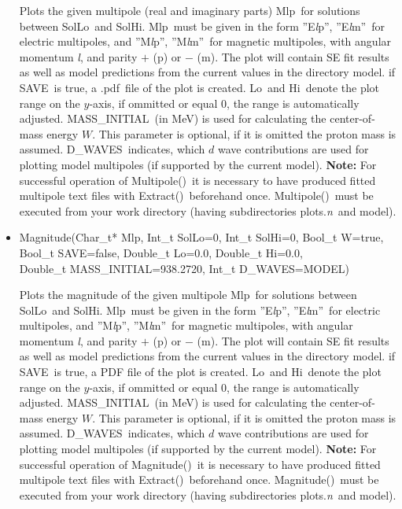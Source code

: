 \documentclass[a4paper,10pt]{article}
\def\tt{\ttfamily}
\def\rm{\rmfamily}
\begin{document}
\begin{itemize}
Plots the given multipole (real and imaginary parts) \tt Mlp\rm\ for solutions between \tt SolLo\rm\ and \tt SolHi\rm.
\tt Mlp\rm\ must be given in the form \tt ''E\textit{l}p''\rm,
\tt ''E\textit{l}m''\rm\ 
for electric multipoles, and
\tt ''M\textit{l}p''\rm,
\tt ''M\textit{l}m''\rm\ 
for magnetic multipoles, with angular momentum \tt\textit{l}\rm, and parity
$+$ (\tt p\rm) or $-$ (\tt m\rm). The plot will contain SE fit results as well as model predictions from the current
values in the directory \tt model\rm.
if \tt SAVE\rm\ is true, a \tt.pdf\rm\ file of the plot is created. \tt Lo\rm\ and \tt Hi\rm\ denote the plot range on the $y$-axis, 
if ommitted or equal 0, the range is automatically adjusted.
\tt MASS\_INITIAL\rm\ (in MeV) is used for calculating the center-of-mass energy $W$. This parameter 
is optional, if it is omitted the proton mass is assumed.
\tt D\_WAVES\rm\ indicates, which $d$ wave contributions are used for plotting model multipoles (if supported by the current model).
\textbf{Note:} For successful operation of \tt Multipole()\rm\ it is necessary to have produced
fitted multipole text files with \tt Extract()\rm\ beforehand once. \tt Multipole()\rm\ must be executed from your
work directory (having subdirectories \tt plots.\textit{n}\rm\ and \tt model\rm).

\item
\tt Magnitude(Char\_t* Mlp, Int\_t SolLo=0, Int\_t SolHi=0, Bool\_t W=true,\\
\phantom{Magnitude(}Bool\_t SAVE=false, Double\_t Lo=0.0, Double\_t Hi=0.0,\\
\phantom{Magnitude(}Double\_t MASS\_INITIAL=938.2720, Int\_t D\_WAVES=MODEL)\rm

Plots the magnitude of the given multipole \tt Mlp\rm\ for solutions between \tt SolLo\rm\ and \tt SolHi\rm.
\tt Mlp\rm\ must be given in the form \tt ''E\textit{l}p''\rm,
\tt ''E\textit{l}m''\rm\ 
for electric multipoles, and
\tt ''M\textit{l}p''\rm,
\tt ''M\textit{l}m''\rm\ 
for magnetic multipoles, with angular momentum \tt\textit{l}\rm, and parity
$+$ (\tt p\rm) or $-$ (\tt m\rm). The plot will contain SE fit results as well as model predictions from the current
values in the directory \tt model\rm.
if \tt SAVE\rm\ is true, a PDF file of the plot is created. \tt Lo\rm\ and \tt Hi\rm\ denote the plot range on the $y$-axis, 
if ommitted or equal 0, the range is automatically adjusted.
\tt MASS\_INITIAL\rm\ (in MeV) is used for calculating the center-of-mass energy $W$. This parameter 
is optional, if it is omitted the proton mass is assumed.
\tt D\_WAVES\rm\ indicates, which $d$ wave contributions are used for plotting model multipoles (if supported by the current model).
\textbf{Note:} For successful operation of \tt Magnitude()\rm\ it is necessary to have produced
fitted multipole text files with \tt Extract()\rm\ beforehand once. \tt Magnitude()\rm\ must be executed from your
work directory (having subdirectories \tt plots.\textit{n}\rm\ and \tt model\rm).


\end{itemize}
\end{document}
